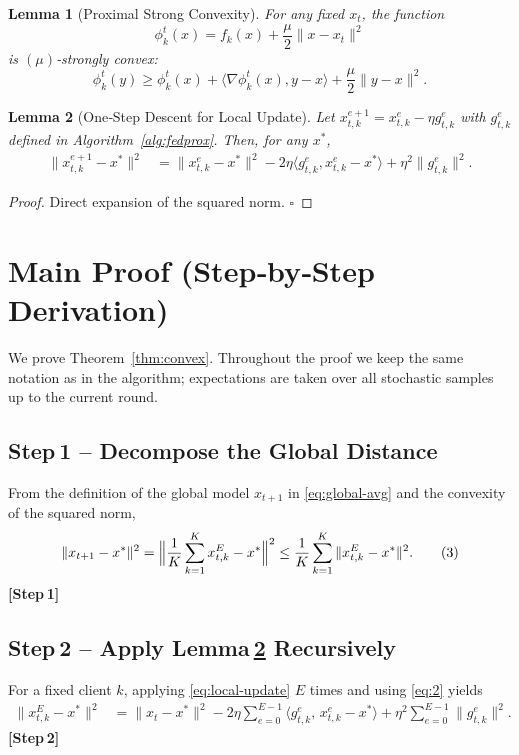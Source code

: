 \documentclass[11pt]{article}
\newtheorem{lemma}{Lemma}
\begin{document}
\begin{lemma}[Proximal Strong Convexity]
\label{lem:prox-strong}
For any fixed $x_t$, the function
\[
\phi_k^{t}(x)=f_k(x)+\frac{\mu}{2}\|x-x_t\|^{2}
\]
is $(\mu)$‑strongly convex:
\[
\phi_k^{t}(y)\ge\phi_k^{t}(x)+\langle\nabla\phi_k^{t}(x),y-x\rangle+\frac{\mu}{2}\|y-x\|^{2}.
\]
\end{lemma}

\begin{lemma}[One‑Step Descent for Local Update]
\label{lem:local-descent}
Let $x_{t,k}^{e+1}=x_{t,k}^{e}-\eta g_{t,k}^{e}$ with $g_{t,k}^{e}$ defined in
Algorithm~\ref{alg:fedprox}. Then, for any $x^{\ast}$,
\begin{align}
\|x_{t,k}^{e+1}-x^{\ast}\|^{2}
&= \|x_{t,k}^{e}-x^{\ast}\|^{2}
   -2\eta\langle g_{t,k}^{e},x_{t,k}^{e}-x^{\ast}\rangle
   +\eta^{2}\|g_{t,k}^{e}\|^{2}. \tag{2}
\end{align}
\end{lemma}
\begin{proof}
Direct expansion of the squared norm. \hfill $\square$
\end{proof}

\section*{Main Proof (Step‑by‑Step Derivation)}
We prove Theorem~\ref{thm:convex}. Throughout the proof we keep the same
notation as in the algorithm; expectations are taken over all stochastic
samples up to the current round.

\subsection*{Step 1 – Decompose the Global Distance}
From the definition of the global model $x_{t+1}$ in \eqref{eq:global-avg} and the
convexity of the squared norm,
\[
\|x_{t+1}-x^{\ast}\|^{2}
= \Bigl\|\frac1K\sum_{k=1}^{K}x_{t,k}^{E}-x^{\ast}\Bigr\|^{2}
\le \frac1K\sum_{k=1}^{K}\|x_{t,k}^{E}-x^{\ast}\|^{2}. \tag{3}
\]
\textbf{[Step 1]}

\subsection*{Step 2 – Apply Lemma \ref{lem:local-descent} Recursively}
For a fixed client $k$, applying \eqref{eq:local-update} $E$ times and using
\eqref{eq:2} yields
\begin{align}
\|x_{t,k}^{E}-x^{\ast}\|^{2}
&= \|x_{t}-x^{\ast}\|^{2}
   -2\eta\sum_{e=0}^{E-1}\langle g_{t,k}^{e},\,x_{t,k}^{e}-x^{\ast}\rangle
   +\eta^{2}\sum_{e=0}^{E-1}\|g_{t,k}^{e}\|^{2}. \tag{4}
\end{align}
\textbf{[Step 2]}
\end{document}
